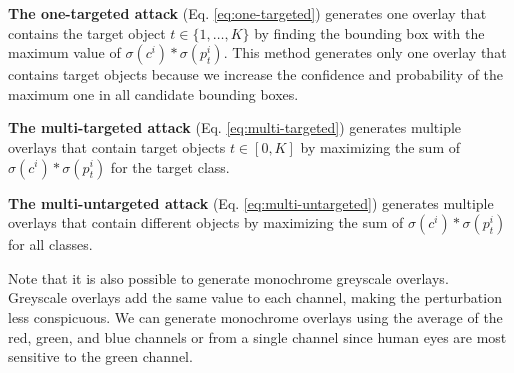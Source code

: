 


\textbf{The one-targeted attack} (Eq. \ref{eq:one-targeted}) generates one overlay that contains the target object $t \in \{1,\dots,K\}$ by finding the bounding box with the maximum value of $\sigma(c^i) * \sigma(p^i_t)$. This method generates only one overlay that contains target objects because we increase the confidence and probability of the maximum one in all candidate bounding boxes.

\textbf{The multi-targeted attack} (Eq. \ref{eq:multi-targeted}) generates multiple overlays that contain target objects $t \in [0, K]$ by maximizing the sum of $\sigma(c^i) * \sigma(p^i_t)$ for the target class.

\textbf{The multi-untargeted attack} (Eq. \ref{eq:multi-untargeted}) generates multiple overlays that contain different objects by maximizing the sum of $\sigma(c^i) * \sigma(p^i_t)$ for all classes.

Note that it is also possible to generate monochrome greyscale overlays. Greyscale overlays add the same value to each channel, making the perturbation less conspicuous. We can generate monochrome overlays using the average of the red, green, and blue channels or from a single channel since human eyes are most sensitive to the green channel.

